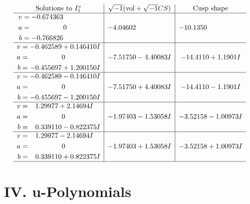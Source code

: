 \documentclass[1p]{elsarticle_modified}
\theoremstyle{definition}
\newcommand{\I}{\sqrt{-1}}
\begin{document}
$$\begin{array}{c|c|c}  
\text{Solutions to }I^v_{1}& \I (\text{vol} + \sqrt{-1}CS) & \text{Cusp shape}\\
 \hline 
\begin{aligned}
v &= -0.674363\phantom{ +0.000000I} \\
a &= \phantom{-0.000000 } 0 \\
b &= -0.766826\phantom{ +0.000000I}\end{aligned}
 & -4.04602\phantom{ +0.000000I} & -10.1350\phantom{ +0.000000I} \\ \hline\begin{aligned}
v &= -0.462589 + 0.146410 I \\
a &= \phantom{-0.000000 } 0 \\
b &= -0.455697 + 1.200150 I\end{aligned}
 & -7.51750 - 4.40083 I & -14.4110 + 1.1901 I \\ \hline\begin{aligned}
v &= -0.462589 - 0.146410 I \\
a &= \phantom{-0.000000 } 0 \\
b &= -0.455697 - 1.200150 I\end{aligned}
 & -7.51750 + 4.40083 I & -14.4110 - 1.1901 I \\ \hline\begin{aligned}
v &= \phantom{-}1.29977 + 2.14694 I \\
a &= \phantom{-0.000000 } 0 \\
b &= \phantom{-}0.339110 - 0.822375 I\end{aligned}
 & -1.97403 - 1.53058 I & -3.52158 - 1.00973 I \\ \hline\begin{aligned}
v &= \phantom{-}1.29977 - 2.14694 I \\
a &= \phantom{-0.000000 } 0 \\
b &= \phantom{-}0.339110 + 0.822375 I\end{aligned}
 & -1.97403 + 1.53058 I & -3.52158 + 1.00973 I\\
 \hline 
 \end{array}$$\newpage
\newpage\renewcommand{\arraystretch}{1}
\centering \section*{ IV. u-Polynomials}
\end{document}
